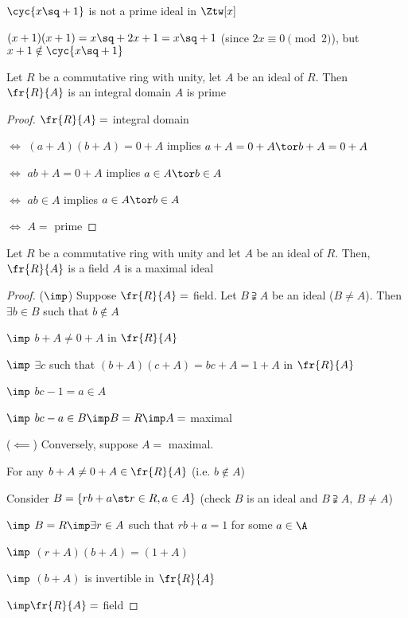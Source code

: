 \begin{example}
  \( \cyc{x\sq + 1} \) is not a prime ideal in \( \Ztw[x] \)
  \begin{note}
    \( (x+1)(x+1) = x\sq + 2x + 1 = x\sq + 1 \) (since \( 2x\equiv 0\pmod 2 \)), but \( x+1 \notin\cyc{x\sq+1} \)
  \end{note}
\end{example}

\begin{theorem}
  Let \( R \) be a commutative ring with unity, let \( A \) be an ideal of \( R \). Then \( \fr{R}{A} \) is an integral domain \tiff \( A \) is prime
\end{theorem}

\begin{proof}
  \( \fr{R}{A} = \) integral domain

  \( \iff \) \( (a+A)(b+A) = 0+A \) implies \( a+A = 0+A \tor b+A = 0+A \)

  \( \iff \) \( ab+A = 0+A \) implies \( a\in A \tor b\in A \)

  \( \iff \) \( ab\in A \) implies \( a\in A \tor b\in A \)

  \( \iff \) \( A = \) prime
\end{proof}

\begin{theorem}
  Let \( R \) be a commutative ring with unity and let \( A \) be an ideal of \( R \). Then, \( \fr{R}{A} \) is a field \tiff \( A \) is a maximal ideal
\end{theorem}

\begin{proof}
  (\( \imp \)) Suppose \( \fr{R}{A} = \) field. Let \( B\supsetneqq A \) be an ideal (\( B\neq A \)). Then \( \exists b \in B \) such that \( b\not\in A \)

    \( \imp \) \( b+A \neq 0+A \) in \( \fr{R}{A} \)

    \( \imp \) \( \exists c \) such that \( (b+A)(c+A) = bc+A = 1+A \) in \( \fr{R}{A} \)

    \( \imp \) \( bc-1 = a \in A \)

    \( \imp \) \( bc-a \in B \imp B = R \imp A = \) maximal

    (\( \impliedby \)) Conversely, suppose \( A = \) maximal.

    For any \( b+A \neq 0+A \in\fr{R}{A} \) (i.e. \( b\not\in A \))

    Consider \( B = \{rb+a \st r\in R, a\in A\} \) (check \( B \) is an ideal and \( B\supsetneqq A,\ B\neq A \))

    \( \imp \) \( B = R \imp \exists r\in A \) such that \( rb+a = 1 \) for some \( a\in\A \)

    \( \imp \) \( (r+A)(b+A) = (1+A) \)

    \( \imp \) \( (b+A) \) is invertible in \( \fr{R}{A} \)

    \( \imp \fr{R}{A} = \) field
\end{proof}

